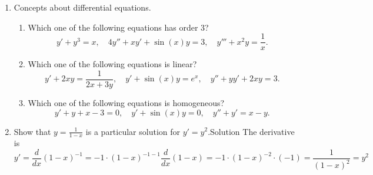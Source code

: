 \documentclass[12pt]{article}
\newcommand{\ratkaisu}[1]{{\color{blue}\quad\textrm{Solution } #1}}
\begin{document}
\begin{enumerate}
\item Concepts about differential equations.
\begin{enumerate}


\item Which one of the following equations has order $3$?
$$
y'+y^3=x,\quad 4
y''+xy'+\sin(x)y=3,\quad
\boxed{y'''+x^2y=\frac{1}{x}}.
$$%
\item Which one of the following equations is linear?
$$
y'+2xy=\frac{1}{2x+3y},\quad 
\boxed{y'+\sin(x)y=e^x},\quad 
y''+yy'+2xy=3.
$$%
\item Which one of the following equations is homogeneous?
$$
y'+y+x-3=0,\quad
\boxed{y'+\sin(x)y=0},\quad
y''+y'=x-y.
$$
\end{enumerate}
\item Show that $y=\frac{1}{1-x}$ is a particular solution for $y'=y^2$.\ratkaisu{The derivative is
$$
y'=\frac{d}{dx}(1-x)^{-1}=-1\cdot (1-x)^{-1-1}\frac{d}{dx}(1-x)=-1\cdot (1-x)^{-2}\cdot(-1)=\frac{1}{(1-x)^2}=y^2
$$}


\end{enumerate}
\end{document}
